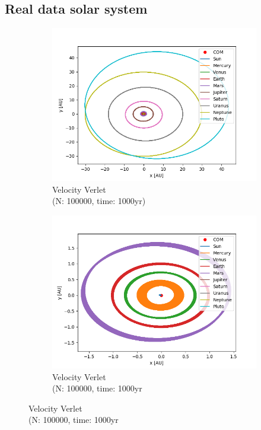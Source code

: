 \documentclass{article}
\begin{document}
\subsection*{Real data solar system}
\begin{figure}[H]
  \centering
  \begin{subfigure}{0.5\textwidth}
    \centering
    \includegraphics[width=1.0\textwidth]{plots/allplanets.png}
    \caption{Velocity Verlet \\(N: 100000, time: 1000yr)}
  \end{subfigure}%
    \begin{subfigure}{0.5\textwidth}
    \centering
    \includegraphics[width=1.0\textwidth]{plots/allplanetszoom.png}
    \caption{Velocity Verlet \\(N: 100000, time: 1000yr}  
  \end{subfigure}
\end{figure}
\end{document}
